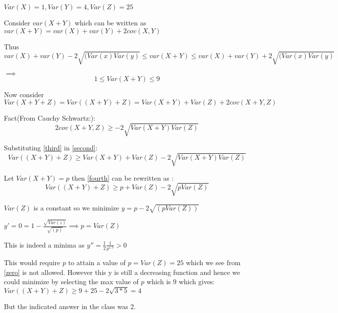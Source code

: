 \documentclass{article}
\begin{document}
$Var(X)=1, Var(Y)=4, Var(Z)=25$

Consider $var(X+Y)$ which can be written as $var(X+Y)= var(X)+var(Y) + 2 cov(X,Y)$



Thus
\begin{equation}
var(X) + var(Y) - 2 \sqrt{(Var(x)Var(y)} \leq var(X+Y) \leq var(X) + var(Y) + 2  \sqrt{(Var(x)Var(y)}  
\label{first}
\end{equation}

$\implies $
\begin{equation}
1 \leq Var(X+Y) \leq 9
\label{zero}
\end{equation}

Now consider
\begin{equation}
Var(X+Y+Z) = Var((X+Y)+Z) = Var(X+Y) + Var(Z) + 2cov(X+Y,Z)
\label{second}
\end{equation} 

Fact(From Cauchy Schwartz:): 
\begin{equation}
2cov(X+Y,Z) \geq - 2\sqrt{Var(X+Y)Var(Z)}
\label{third}
\end{equation}

Substituting \ref{third} in \ref{second}: 
\begin{equation}
Var((X+Y)+Z) \geq Var(X+Y) + Var(Z) - 2\sqrt{Var(X+Y)Var(Z)}
\label{fourth}
\end{equation}

Let $Var(X+Y) = p$ then \ref{fourth} can be rewritten as : \\
\begin{equation}
Var((X+Y)+Z) \geq p + Var(Z) - 2\sqrt{pVar(Z)}
\end{equation}

$Var(Z)$ is a constant so we minimize $y=p-2\sqrt{(pVar(Z))}$

$y' = 0 = 1-\frac{\sqrt{Var(z)}}{\sqrt{(p)}} \implies  p = Var(Z) $

This is indeed a minima as $y''=\frac{1}{2}\frac{1}{p^{1.5}} > 0$

This would require $p$ to attain a value of $p=Var(Z)=25$ which we see from  \ref{zero} is not allowed. However this y is still a decreasing function and hence we could minimize by selecting the max value of $p$ which is $9$ which gives:\\
$Var((X+Y)+Z) \geq 9 + 25 - 2\sqrt{3*5} = 4$

But the indicated answer in the class was 2.
\end{document}
